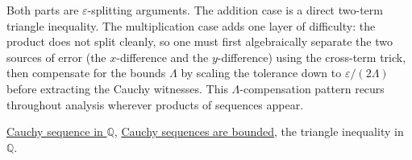 \begin{remark*}
Both parts are $\varepsilon$-splitting arguments.  The addition case is a
direct two-term triangle inequality.  The multiplication case adds one
layer of difficulty: the product does not split cleanly, so one must first
algebraically separate the two sources of error (the $x$-difference and
the $y$-difference) using the cross-term trick, then compensate for the
bounds $\Lambda$ by scaling the tolerance down to $\varepsilon/(2\Lambda)$
before extracting the Cauchy witnesses.  This $\Lambda$-compensation pattern
recurs throughout analysis wherever products of sequences appear.
\end{remark*}

\begin{dependencies}
\hyperref[def:cauchy-rational]{Cauchy sequence in $\mathbb{Q}$},
\hyperref[thm:cauchy-bounded-q]{Cauchy sequences are bounded},
the triangle inequality in $\mathbb{Q}$.
\end{dependencies}
